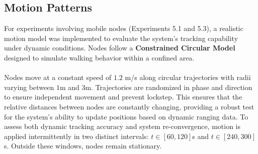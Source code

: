 \subsection{Motion Patterns}

\noindent For experiments involving mobile nodes (Experiments 5.1 and 5.3), a realistic motion model was implemented to evaluate the system's tracking capability under dynamic conditions. Nodes follow a \textbf{Constrained Circular Model} designed to simulate walking behavior within a confined area.
\\\\
\noindent Nodes move at a constant speed of $1.2$ m/s along circular trajectories with radii varying between $1$m and $3$m. Trajectories are randomized in phase and direction to ensure independent movement and prevent lockstep. This ensures that the relative distances between nodes are constantly changing, providing a robust test for the system's ability to update positions based on dynamic ranging data. To assess both dynamic tracking accuracy and system re-convergence, motion is applied intermittently in two distinct intervals: $t \in [60, 120]$s and $t \in [240, 300]$s. Outside these windows, nodes remain stationary.







